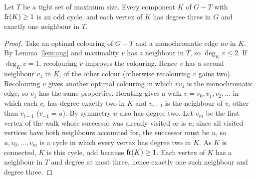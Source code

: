 \begin{lemma}\label{lem:stuck}
Let $T$ be a tight set of maximum size. Every component $K$ of $G-T$ with $\operatorname{fr}(K)\ge1$ is an odd
cycle, and each vertex of $K$ has degree three in $G$ and exactly one neighbour in $T$.
\end{lemma}
\begin{proof}
Take an optimal colouring of $G-T$ and a monochromatic edge $uv$ in $K$. By
Lemma~\ref{lem:aug} and maximality $v$ has a neighbour in $T$, so $\deg_K v\le2$. If
$\deg_K v=1$, recolouring $v$ improves the colouring. Hence $v$ has a second neighbour $v_1$
in $K$, of the other colour (otherwise recolouring $v$ gains two). Recolouring $v$ gives another
optimal colouring in which $v v_1$ is the monochromatic edge, so $v_1$ has the same properties.
Iterating gives a walk $v=v_0,v_1,v_2,\dots$ in which each $v_i$ has degree exactly two in $K$
and $v_{i+1}$ is the neighbour of $v_i$ other than $v_{i-1}$ ($v_{-1}=u$). By symmetry $u$ also has
degree two. Let $v_m$ be the first vertex of the walk whose successor was already visited or is
$u$; since all visited vertices have both neighbours accounted for, the successor must be $u$, so
$u,v_0,\dots,v_m$ is a cycle in which every vertex has degree two in $K$. As $K$ is connected,
$K$ is this cycle, odd because $\operatorname{fr}(K)\ge1$. Each vertex of $K$ has a neighbour in $T$ and degree at most
three, hence exactly one such neighbour and degree three.
\end{proof}


